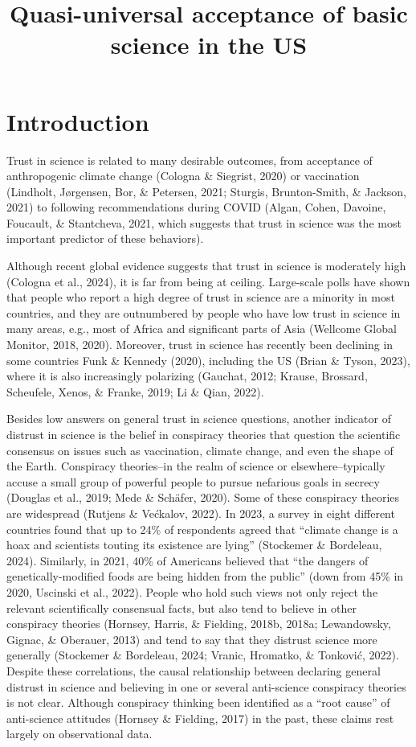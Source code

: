 \documentclass[
  doc,floatsintext]{apa6}
\title{Quasi-universal acceptance of basic science in the US}
\author{\textsuperscript{}}
\date{}
\affiliation{\vspace{0.5cm}\textsuperscript{} }
\begin{document}
\maketitle

\section{Introduction}\label{introduction}

Trust in science is related to many desirable outcomes, from acceptance of anthropogenic climate change (Cologna \& Siegrist, 2020) or vaccination (Lindholt, Jørgensen, Bor, \& Petersen, 2021; Sturgis, Brunton-Smith, \& Jackson, 2021) to following recommendations during COVID (Algan, Cohen, Davoine, Foucault, \& Stantcheva, 2021, which suggests that trust in science was the most important predictor of these behaviors).

Although recent global evidence suggests that trust in science is moderately high (Cologna et al., 2024), it is far from being at ceiling. Large-scale polls have shown that people who report a high degree of trust in science are a minority in most countries, and they are outnumbered by people who have low trust in science in many areas, e.g., most of Africa and significant parts of Asia (Wellcome Global Monitor, 2018, 2020). Moreover, trust in science has recently been declining in some countries Funk \& Kennedy (2020), including the US (Brian \& Tyson, 2023), where it is also increasingly polarizing (Gauchat, 2012; Krause, Brossard, Scheufele, Xenos, \& Franke, 2019; Li \& Qian, 2022).

Besides low answers on general trust in science questions, another indicator of distrust in science is the belief in conspiracy theories that question the scientific consensus on issues such as vaccination, climate change, and even the shape of the Earth. Conspiracy theories--in the realm of science or elsewhere--typically accuse a small group of powerful people to pursue nefarious goals in secrecy (Douglas et al., 2019; Mede \& Schäfer, 2020). Some of these conspiracy theories are widespread (Rutjens \& Većkalov, 2022). In 2023, a survey in eight different countries found that up to 24\% of respondents agreed that ``climate change is a hoax and scientists touting its existence are lying'' (Stockemer \& Bordeleau, 2024). Similarly, in 2021, 40\% of Americans believed that ``the dangers of genetically-modified foods are being hidden from the public'' (down from 45\% in 2020, Uscinski et al., 2022). People who hold such views not only reject the relevant scientifically consensual facts, but also tend to believe in other conspiracy theories (Hornsey, Harris, \& Fielding, 2018b, 2018a; Lewandowsky, Gignac, \& Oberauer, 2013) and tend to say that they distrust science more generally (Stockemer \& Bordeleau, 2024; Vranic, Hromatko, \& Tonković, 2022). Despite these correlations, the causal relationship between declaring general distrust in science and believing in one or several anti-science conspiracy theories is not clear. Although conspiracy thinking been identified as a ``root cause'' of anti-science attitudes (Hornsey \& Fielding, 2017) in the past, these claims rest largely on observational data.
\end{document}
